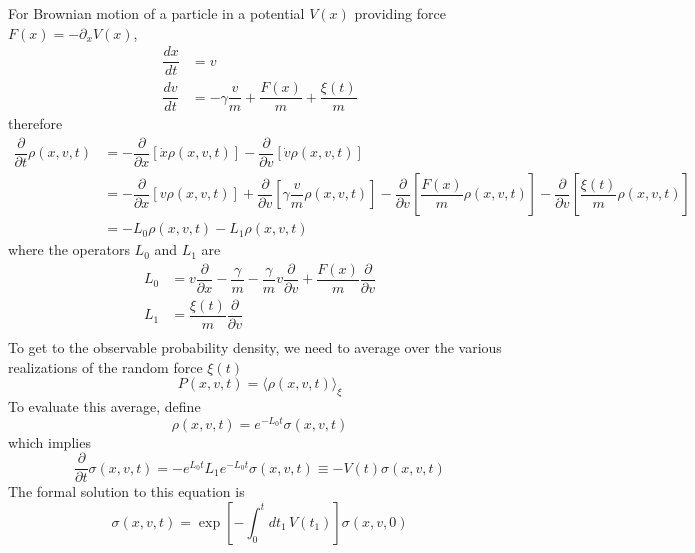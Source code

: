 \documentclass[aps,prb,onecolumn,notitlepage,showpacs,floatfix,superscriptaddress]{revtex4-1}
\begin{document}
For Brownian motion of a particle in a potential $V(x)$ providing force $F(x) = -\partial_x V(x)$,
\begin{equation}
\begin{split}
\dfrac{dx}{dt} &= v \\
\dfrac{dv}{dt} &= - \gamma \dfrac{v}{m}	+ \dfrac{F(x)}{m} + \dfrac{\xi(t)}{m}
\end{split}
\end{equation}
therefore
\begin{equation}
\begin{split}
\dfrac{\partial}{\partial t}  \rho(x,v,t) &= - \dfrac{\partial}{\partial x} [\dot{x} \rho(x,v,t)] - \dfrac{\partial}{\partial v} [\dot{v} \rho(x,v,t)] \\
 &= - \dfrac{\partial}{\partial x} \left[v \rho(x,v,t)\right] + \dfrac{\partial}{\partial v} \left[ \gamma \dfrac{v}{m} \rho(x,v,t)\right] - \dfrac{\partial}{\partial v} \left[ \dfrac{F(x)}{m} \rho(x,v,t)\right] - \dfrac{\partial}{\partial v} \left[ \dfrac{\xi(t)}{m} \rho(x,v,t)\right] \\
 &= -L_0 \rho(x,v,t) - L_1 \rho(x,v,t)
\end{split}
\end{equation}
where the operators $L_0$ and $L_1$ are 
\begin{equation}
\begin{split}
L_0 &= v \dfrac{\partial}{\partial x} - \dfrac{\gamma}{m} - \dfrac{\gamma}{m} v \dfrac{\partial}{\partial v} +  \dfrac{F(x)}{m} \dfrac{\partial}{\partial v} \\
L_1 &= \dfrac{\xi(t)}{m} \dfrac{\partial}{\partial v} \\
\end{split}
\end{equation}
To get to the observable probability density, we need to average over the various realizations of the random force $\xi(t)$
\begin{equation}
P(x,v,t) = \langle \rho(x,v,t)\rangle_\xi
\end{equation}
To evaluate this average, define
\begin{equation}
\rho(x,v,t) = e^{-L_0 t} \sigma(x,v,t)
\end{equation}
which implies
\begin{equation}
\dfrac{\partial}{\partial t}  \sigma(x,v,t) = - e^{L_0 t} L_1 e^{-L_0 t} \sigma(x,v,t) \equiv - V(t) \sigma(x,v,t)
\end{equation}
The formal solution to this equation is 
\begin{equation}
\sigma(x,v,t) = \exp\left[-\int_0^t dt_1 \, V(t_1) \right] \sigma(x,v,0)
\end{equation}
\end{document}
